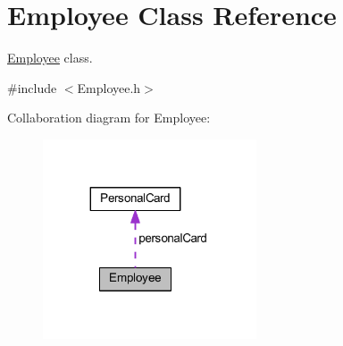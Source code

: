 \hypertarget{class_employee}{}\section{Employee Class Reference}
\label{class_employee}


\hyperlink{class_employee}{Employee} class.  




{\ttfamily \#include $<$Employee.\+h$>$}



Collaboration diagram for Employee\+:
\nopagebreak
\begin{figure}[H]
\begin{center}
\leavevmode
\includegraphics[width=179pt]{class_employee__coll__graph}
\end{center}
\end{figure}
